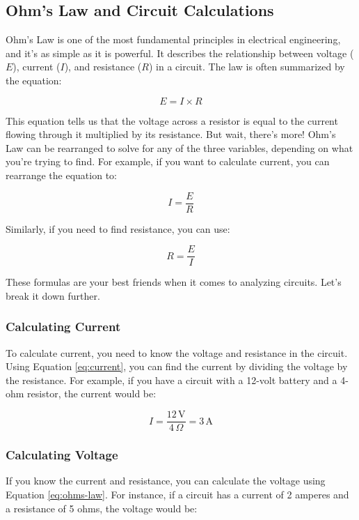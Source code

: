 \subsection{Ohm’s Law and Circuit Calculations}
\label{subsec:ohms-law}

Ohm's Law is one of the most fundamental principles in electrical engineering, and it’s as simple as it is powerful. It describes the relationship between voltage (\(E\)), current (\(I\)), and resistance (\(R\)) in a circuit. The law is often summarized by the equation:

\begin{equation}
    E = I \times R
    \label{eq:ohms-law}
\end{equation}

This equation tells us that the voltage across a resistor is equal to the current flowing through it multiplied by its resistance. But wait, there’s more! Ohm’s Law can be rearranged to solve for any of the three variables, depending on what you’re trying to find. For example, if you want to calculate current, you can rearrange the equation to:

\begin{equation}
    I = \frac{E}{R}
    \label{eq:current}
\end{equation}

Similarly, if you need to find resistance, you can use:

\begin{equation}
    R = \frac{E}{I}
    \label{eq:resistance}
\end{equation}

These formulas are your best friends when it comes to analyzing circuits. Let’s break it down further.


\subsubsection*{Calculating Current}
To calculate current, you need to know the voltage and resistance in the circuit. Using Equation \ref{eq:current}, you can find the current by dividing the voltage by the resistance. For example, if you have a circuit with a 12-volt battery and a 4-ohm resistor, the current would be:

\[
I = \frac{12\,\text{V}}{4\,\Omega} = 3\,\text{A}
\]

\subsubsection*{Calculating Voltage}
If you know the current and resistance, you can calculate the voltage using Equation \ref{eq:ohms-law}. For instance, if a circuit has a current of 2 amperes and a resistance of 5 ohms, the voltage would be:

